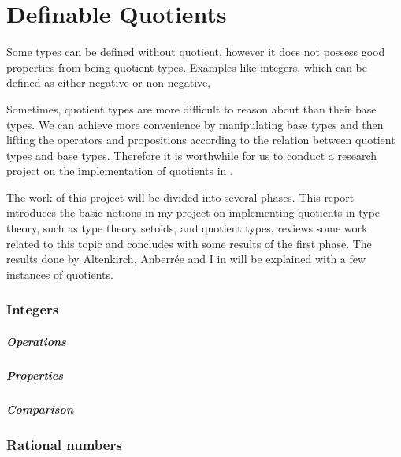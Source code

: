 \chapter{Definable Quotients}


Some types can be defined without quotient, however it does not
possess good properties from being quotient types. Examples like
integers, which can be defined as either negative or non-negative,


Sometimes, quotient types are more difficult to reason about than
their base types. 
We can achieve more convenience by manipulating base types and then lifting the operators and propositions according to the relation between quotient types and base types.
Therefore it is worthwhile for us to conduct a research project on the
implementation of quotients in \itt.


The work of this project will be divided into several phases. This
report introduces the basic notions in my project on implementing
quotients in type theory, such as type theory setoids, and quotient
types, reviews some work related to this topic and concludes with some
results of the first phase. 
The results done by Altenkirch, Anberr\'{e}e and I in \cite{aan} will be explained with a
few instances of quotients.


\subsection{Integers}


\paragraph{Operations}

\paragraph{Properties}


\paragraph{Comparison}



\subsection{Rational numbers}

